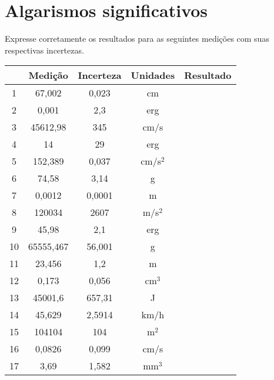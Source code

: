 \chapter{Algarismos significativos}

\vspace{-0.7cm}

Expresse corretamente os resultados para as seguintes medições com suas respectivas incertezas.

\begin{center}
\vspace{-1cm}
  \begin{tabular}{|c | c | c | c |>{ \centering\arraybackslash}m{8cm} |}  \hline
    & Medição	& Incerteza	& Unidades	& Resultado \\ \hline	 	
    1 & 67,002 & 0,023 & cm & \\ \hline
2 & 0,001 & 2,3 & erg & \\ \hline
3 & 45612,98 & 345 & cm/s & \\ \hline
4 & 14 & 29 & erg & \\ \hline
5 & 152,389 & 0,037 & cm/s$^2$ & \\ \hline
6 & 74,58 & 3,14 & g & \\ \hline
7 & 0,0012 & 0,0001 & m & \\ \hline
8 & 120034 & 2607 & m/s$^2$ & \\ \hline
9 & 45,98 & 2,1 & erg & \\ \hline
10 & 65555,467 & 56,001 & g & \\ \hline
11 & 23,456 & 1,2 & m & \\ \hline
12 & 0,173 & 0,056 & cm$^3$ & \\ \hline
13 & 45001,6 & 657,31 & J & \\ \hline
14 & 45,629 & 2,5914 & km/h & \\ \hline
15 & 104104 & 104 & m$^2$ & \\ \hline
16 & 0,0826 & 0,099 & cm/s & \\ \hline
17 & 3,69 & 1,582 & mm$^3$ & \\ \hline


    
  \end{tabular}
\end{center}


